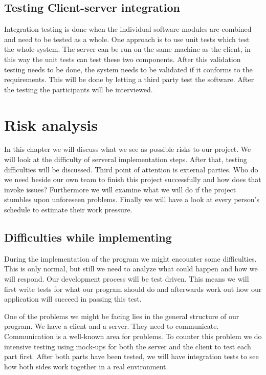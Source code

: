\documentclass[a4paper]{article}
\begin{document}



\subsection{Testing Client-server integration}
Integration testing is done when the individual software modules are combined and need to be tested as a whole. One approach is to use unit tests which test the whole system. The server can be run on the same machine as the client, in this way the unit tests can test these two components.
After this validation testing needs to be done, the system needs to be validated if it conforms to the requirements. This will be done by letting a third party test the software. After the testing the participants will be interviewed.

\section{Risk analysis}
In this chapter we will discuss what we see as possible risks to our project. We will look at the difficulty of serveral implementation steps. After that, testing difficulties will be discussed. Third point of attention is external parties. Who do we need beside our own team to finish this project successfully and how does that invoke issues? Furthermore we will examine what we will do if the project stumbles upon unforeseen problems. Finally we will have a look at every person’s schedule to estimate their work pressure.

\subsection{Difficulties while implementing}
During the implementation of the program we might encounter some difficulties. This is only normal, but still we need to analyze what could happen and how we will respond. Our development process will be test driven. This means we will first write tests for what our program should do and afterwards work out how our application will succeed in passing this test.
 
One of the problems we might be facing lies in the general structure of our program. We have a client and a server. They need to communicate. Communication is a well-known area for problems. To counter this problem we do intensive testing using mock-ups for both the server and the client to test each part first. After both parts have been tested, we will have integration tests to see how both sides work together in a real environment. 
\end{document}
